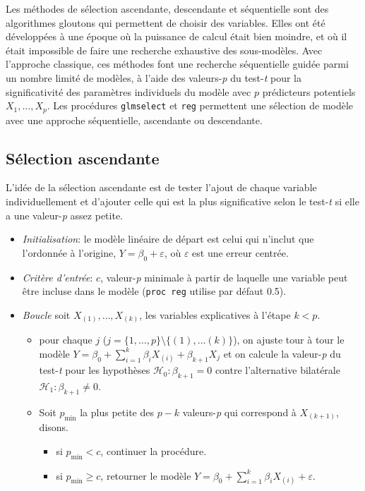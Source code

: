 \documentclass[
  11pt,
  letterpaper,
]{book}
\providecommand{\tightlist}{%
  \setlength{\itemsep}{0pt}\setlength{\parskip}{0pt}}
\theoremstyle{definition}
\theoremstyle{definition}
\theoremstyle{definition}
\theoremstyle{remark}
\begin{document}
Les méthodes de sélection ascendante, descendante et séquentielle sont des algorithmes gloutons qui permettent de choisir des variables. Elles ont été développées à une époque où la puissance de calcul était bien moindre, et où il était impossible de faire une recherche exhaustive des sous-modèles. Avec l'approche classique, ces méthodes font une recherche séquentielle guidée parmi un nombre limité de modèles, à l'aide des valeurs-\emph{p} du test-\emph{t} pour la significativité des paramètres individuels du modèle avec \(p\) prédicteurs potentiels \(X_1,\ldots, X_p\). Les procédures \texttt{glmselect} et \texttt{reg} permettent une sélection de modèle avec une approche séquentielle, ascendante ou descendante.

\hypertarget{suxe9lection-ascendante}{%
\subsection{Sélection ascendante}\label{suxe9lection-ascendante}}

L'idée de la sélection ascendante est de tester l'ajout de chaque variable individuellement et d'ajouter celle qui est la plus significative selon le test-\emph{t} si elle a une valeur-\emph{p} assez petite.

\begin{itemize}
\tightlist
\item
  \emph{Initialisation}: le modèle linéaire de départ est celui qui n'inclut que l'ordonnée à l'origine, \(Y=\beta_0+\varepsilon\), où \(\varepsilon\) est une erreur centrée.
\item
  \emph{Critère d'entrée}: \(c\), valeur-\emph{p} minimale à partir de laquelle une variable peut être incluse dans le modèle (\texttt{proc\ reg} utilise par défaut 0.5).
\item
  \emph{Boucle} soit \(X_{(1)}, \ldots, X_{(k)}\), les variables explicatives à l'étape \(k<p\).

  \begin{itemize}
  \tightlist
  \item
    pour chaque \(j\) (\(j=\{1,\ldots, p\}\setminus \{(1), \ldots (k)\}\)), on ajuste tour à tour le modèle \(Y=\beta_0+\sum_{i=1}^k \beta_i X_{(i)} + \beta_{k+1}X_{j}\) et on calcule la valeur-\emph{p} du test-\emph{t} pour les hypothèses \(\mathcal{H}_0: \beta_{k+1}=0\) contre l'alternative bilatérale \(\mathcal{H}_1: \beta_{k+1} \neq 0\).
  \item
    Soit \(p_{\min}\) la plus petite des \(p-k\) valeurs-\emph{p} qui correspond à \(X_{(k+1)}\), disons.

    \begin{itemize}
    \tightlist
    \item
      si \(p_{\min}<c\), continuer la procédure.
    \item
      si \(p_{\min} \geq c\), retourner le modèle \(Y=\beta_0 + \sum_{i=1}^k \beta_iX_{(i)}+\varepsilon\).
    \end{itemize}
  \end{itemize}
\end{itemize}
\end{document}
